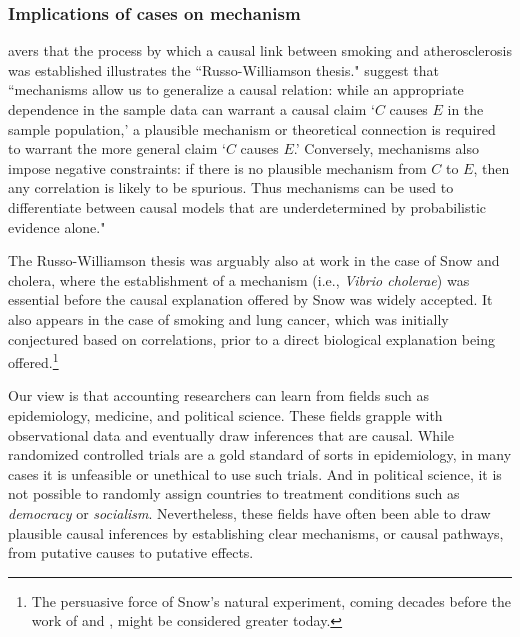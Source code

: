\documentclass[12pt,reqno,titlepage]{amsart}
\begin{document}
\begin{doublespace}
\subsubsection{Implications of cases on mechanism}
 \citet{Gillies2011-GILTRT-3} avers that the process by which a causal link between smoking and atherosclerosis was established illustrates the ``Russo-Williamson thesis."
 \citet[p.\,159]{Russo:2007iz} suggest that ``mechanisms allow us to generalize a causal relation: while an appropriate dependence in the sample data can warrant a causal claim `$C$ causes $E$ in the sample population,' a plausible mechanism or theoretical connection is required to warrant the more general claim `$C$ causes $E$.' Conversely, mechanisms also impose negative constraints: if there is no plausible mechanism from $C$ to $E$, then any correlation is likely to be spurious. Thus mechanisms can be used to differentiate between causal models that are underdetermined by probabilistic evidence alone."

The Russo-Williamson thesis was arguably also at work in the case of Snow and cholera, where the establishment of a mechanism (i.e., \emph{Vibrio cholerae}) was essential before the causal explanation offered by Snow was widely accepted. It also appears in the case of smoking and lung cancer, which was initially conjectured based on correlations, prior to a direct biological explanation being offered.\footnote{
The persuasive force of Snow's natural experiment, coming decades before the work of \citet{Neyman:1923aa} and \citet{Fisher:1935aa}, might be considered greater today.}

Our view is that accounting researchers can learn from fields such as epidemiology, medicine, and political science. 
These fields grapple with observational data and eventually draw inferences that are causal.
While randomized controlled trials are a gold standard of sorts in epidemiology, in many cases it is unfeasible or unethical to use such trials.
And in political science, it is not possible to randomly assign countries to treatment conditions such as \emph{democracy} or \emph{socialism}.
Nevertheless, these fields have often been able to draw plausible causal inferences by establishing clear mechanisms, or causal pathways, from putative causes to putative effects.



\end{doublespace}
\end{document}
